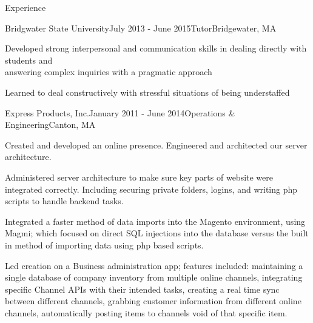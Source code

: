 \documentclass{resume} %
\begin{document}
\begin{rSection}{Experience}
\begin{rSubsection}{Bridgwater State University}{July 2013 - June 2015}{Tutor}{Bridgewater, MA}
 	      \item Developed strong interpersonal and communication skills in dealing directly with students and \\ answering complex inquiries with a pragmatic approach
          \item Learned to deal constructively with stressful situations of being understaffed
\end{rSubsection}

\begin{rSubsection}{Express Products, Inc.}{January 2011 - June 2014}{Operations \& Engineering}{Canton, MA}
 	      \item Created and developed an online presence. Engineered and architected our server architecture. 
 	      \item Administered server architecture to make sure key parts of website were integrated correctly.
 	      Including securing private folders, logins, and writing php scripts to handle backend tasks.
          \item Integrated a faster method of data imports into the Magento environment, using Magmi; which 
          focused on direct SQL injections into the database versus the built in method of importing data using
           php based scripts.
          \item Led creation on a Business administration app; features included: maintaining a single database of company inventory from multiple online channels, integrating specific Channel APIs with their intended tasks, creating a real time sync between different channels, grabbing customer information from different online channels, automatically posting items to channels void of that specific item.
\end{rSubsection}



\end{rSection}


\end{document}
